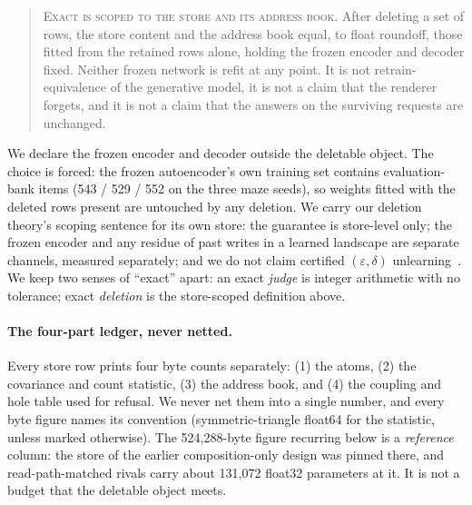 \documentclass{article} %
\begin{document}
\begin{quote}\small
\textsc{Exact is scoped to the store and its address book.} After deleting a set of rows, the store
content and the address book equal, to float roundoff, those fitted from the retained rows alone,
holding the frozen encoder and decoder fixed. Neither frozen network is refit at any point. It is
not retrain-equivalence of the generative model, it is not a claim that the renderer forgets, and it
is not a claim that the answers on the surviving requests are unchanged.
\end{quote}

\noindent We declare the frozen encoder and decoder outside the deletable object. The choice
is forced: the frozen autoencoder's own training set contains evaluation-bank items
(543 / 529 / 552 on the three maze seeds), so weights fitted with the deleted rows present are untouched by any deletion. %
We carry our deletion theory's scoping sentence for its own store: the guarantee
is store-level only; the frozen encoder and any residue of past writes in a learned
landscape are separate channels, measured separately; and we do not claim certified
$(\varepsilon,\delta)$ unlearning~\citep{guo2020certified}. %
We keep two senses of ``exact'' apart: an exact \emph{judge} is integer arithmetic with no
tolerance; exact \emph{deletion} is the store-scoped definition above.

\paragraph{The four-part ledger, never netted.} Every store row prints four byte counts
separately: (1) the atoms, (2) the covariance and count statistic, (3) the address book, and
(4) the coupling and hole table used for refusal.
We never net them into a single number, and every byte figure names its convention
(symmetric-triangle float64 for the statistic, unless marked otherwise). The 524,288-byte figure
recurring below is a \emph{reference} column: the store of the earlier composition-only design
was pinned there, and read-path-matched rivals carry about 131,072 float32 parameters at it. %
It is not a budget that the deletable object meets.
\end{document}
